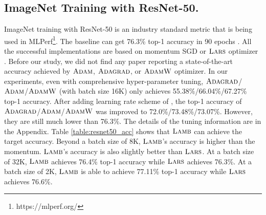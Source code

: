\subsection{ImageNet Training with ResNet-50.}
ImageNet training with ResNet-50 is an industry standard metric that is being used in MLPerf\footnote{https://mlperf.org/}. 
The baseline can get 76.3\% top-1 accuracy in 90 epochs \citep{goyal2017accurate}.
All the successful implementations are based on momentum SGD \citep{he2016deep, goyal2017accurate} or $\textsc{Lars}$ optimizer \citep{ying2018image, jia2018highly, mikami2018imagenet, you2018imagenet,yamazaki2019yet}.
Before our study, we did not find any paper reporting a state-of-the-art accuracy achieved by $\textsc{Adam}$, $\textsc{Adagrad}$, or $\textsc{AdamW}$ optimizer.
In our experiments, even with comprehensive hyper-parameter tuning, $\textsc{Adagrad}$/$\textsc{Adam}$/$\textsc{AdamW}$ (with batch size 16K) only achieves 55.38\%/66.04\%/67.27\% top-1 accuracy.
After adding learning rate scheme of \cite{goyal2017accurate},
the top-1 accuracy of $\textsc{Adagrad}$/$\textsc{Adam}$/$\textsc{AdamW}$ was improved to 72.0\%/73.48\%/73.07\%.
However, they are still much lower than 76.3\%.
The details of the tuning information are in the Appendix.
Table \ref{table:resnet50_acc} shows that $\textsc{Lamb}$ can achieve the target accuracy.
Beyond a batch size of 8K, $\textsc{Lamb}$'s accuracy is higher than the momentum.
$\textsc{Lamb}$'s accuracy is also slightly better than $\textsc{Lars}$.
At a batch size of 32K, $\textsc{Lamb}$ achieves 76.4\% top-1 accuracy while $\textsc{Lars}$ achieves 76.3\%.
At a batch size of 2K, $\textsc{Lamb}$ is able to achieve 77.11\% top-1 accuracy while $\textsc{Lars}$ achieves 76.6\%.

